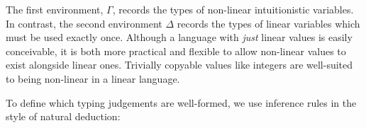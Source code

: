 \documentclass[]{unswthesis}
\newcommand{\types}{\vdash}
\let\i\textit
\let\b\textbf
\begin{document}
The first environment, $\Gamma$, records the types of non-linear intuitionistic variables. In contrast, the second environment $\Delta$ records the types of linear variables which must be used exactly once. Although a language with \i{just} linear values is easily conceivable, it is both more practical and flexible to allow non-linear values to exist alongside linear ones. Trivially copyable values like integers are well-suited to being non-linear in a linear language.

To define which typing judgements are well-formed, we use inference rules in the style of natural deduction:





\end{document}
